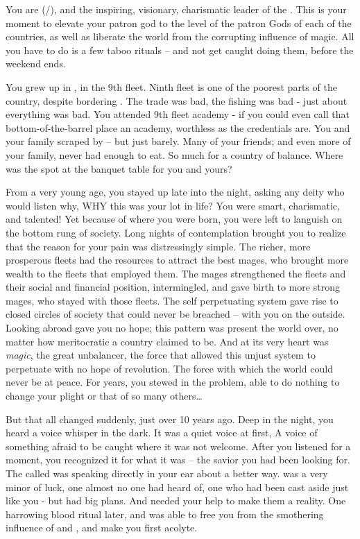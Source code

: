 \documentclass[char]{GL2020}
\begin{document}
\name{\cChupLeader{}}


You are \cChupLeader{\full} (\cChupLeader{\they}/\cChupLeader{\them}), and the inspiring, visionary, charismatic leader of the \pGoaties{}. This is your moment to elevate your patron god \cGenesis{} to the level of the patron Gods of each of the countries, as well as liberate the world from the corrupting influence of magic. All you have to do is a few taboo rituals -- and not get caught doing them, before the weekend ends.

You grew up in \pShip{}, in the 9th fleet. Ninth fleet is one of the poorest parts of the country, despite bordering \pFarm{}. The trade was bad, the fishing was bad - just about everything was bad. You attended 9th fleet academy - if you could even call that bottom-of-the-barrel place an academy, worthless as the credentials are. You and your family scraped by -- but just barely. Many of your friends; and even more of your family, never had enough to eat. So much for a country of balance. Where was the spot at the banquet table for you and yours?

From a very young age, you stayed up late into the night, asking any deity who would listen why, WHY this was your lot in life? You were smart, charismatic, and talented! Yet because of where you were born, you were left to languish on the bottom rung of society. Long nights of contemplation brought you to realize that the reason for your pain was distressingly simple. The richer, more prosperous fleets had the resources to attract the best mages, who brought more wealth to the fleets that employed them. The mages strengthened the fleets and their social and financial position, intermingled, and gave birth to more strong mages, who stayed with those fleets. The self perpetuating system gave rise to closed circles of society that could never be breached -- with you on the outside. Looking abroad gave you no hope; this pattern was present the world over, no matter how meritocratic a country claimed to be. And at its very heart was \emph{magic}, the great unbalancer, the force that allowed this unjust system to perpetuate with no hope of revolution. The force with which the world could never be at peace. For years, you stewed in the problem, able to do nothing to change your plight or that of so many others\ldots

But that all changed suddenly, just over 10 years ago. Deep in the night, you heard a voice whisper in the dark. It was a quiet voice at first, A voice of something afraid to be caught where it was not welcome. After you listened for a moment, you recognized it for what it was -- the savior you had been looking for. The \cGenesis{\God} called \cGenesis{} was speaking directly in your ear about a better way. \cGenesis{} was a very minor \cGenesis{\God} of luck, one almost no one had heard of, one who had been cast aside just like you - but \cGenesis{} had big plans. And \cGenesis{\they} needed your help to make them a reality. One harrowing blood ritual later, and \cGenesis{} was able to free you from the smothering influence of \cEbb{} and \cFlow{}, and make you \cGenesis{\their} first acolyte.
\end{document}
